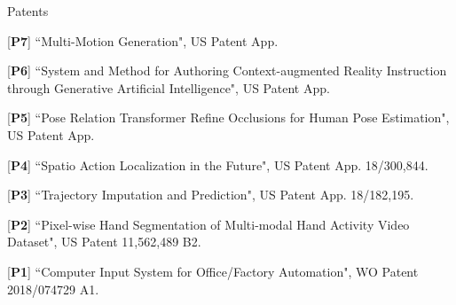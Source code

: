 \begin{cventries}
\vspace{-.5em}
\cvpub
{Patents}{
\begin{cvitems}
    \item {[\textbf{P7}] ``Multi-Motion Generation", US Patent App.}
    \item {[\textbf{P6}] ``System and Method for Authoring Context-augmented Reality Instruction through Generative Artificial Intelligence", US Patent App.}
    \item {[\textbf{P5}] ``Pose Relation Transformer Refine Occlusions for Human Pose Estimation", US Patent App.}
    \item {[\textbf{P4}] ``Spatio Action Localization in the Future", US Patent App. 18/300,844.}
    \item {[\textbf{P3}] ``Trajectory Imputation and Prediction", US Patent App. 18/182,195. }
    \item {[\textbf{P2}] ``Pixel-wise Hand Segmentation of Multi-modal Hand Activity Video Dataset", US Patent 11,562,489 B2.}
    \item {[\textbf{P1}] ``Computer Input System for Office/Factory Automation", WO Patent 2018/074729 A1.}
\end{cvitems}
}


\end{cventries}
